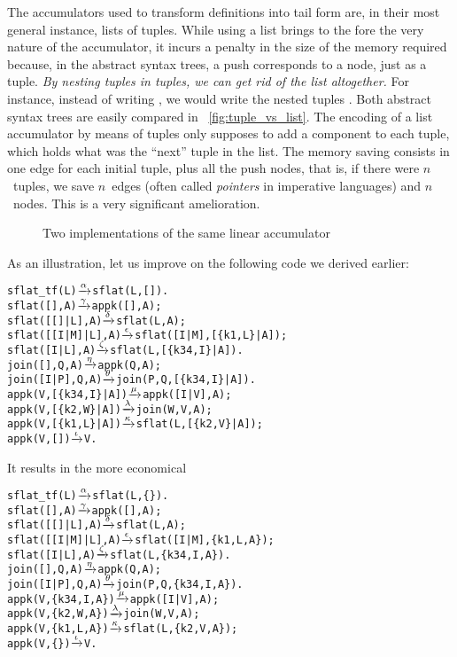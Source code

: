 The accumulators used to transform definitions into tail form are, in
their most general instance, lists of tuples. While using a list
brings to the fore the very nature of the accumulator, it incurs a
penalty in the size of the memory required because, in the abstract
syntax trees, a push corresponds to a node, just as a tuple. \emph{By
  nesting tuples in tuples, we can get rid of the list altogether.}
For instance, instead of writing
\erlcode{[\{k3,\(I_1\)\},\{k1,\(V\),\(E\)\},\{k3,\(I_2\)\}]}, we would
write the nested tuples
. Both
abstract syntax trees are easily compared in
\fig~\vref{fig:tuple_vs_list}. The encoding of a list accumulator by
means of tuples only supposes to add a component to each tuple, which
holds what was the ``next'' tuple in the list. The memory saving
consists in one edge for each initial tuple, plus all the push nodes,
that is, if there were \(n\)~tuples, we save \(n\)~edges (often called
\emph{pointers} in imperative languages) and \(n\)~nodes. This is a
very significant amelioration.
\begin{figure}[t]
\centering
{}
\caption{Two implementations of the same linear accumulator
\label{fig:tuple_vs_list}}
\end{figure}
As an illustration, let us improve on the following code we derived
earlier:
\begin{alltt}
sflat_tf(L)         \(\smashedrightarrow{\alpha}\) sflat(L,[]).
sflat(       [],A)  \(\smashedrightarrow{\gamma}\) appk([],A);
sflat(   [[]|L],A)  \(\smashedrightarrow{\delta}\) sflat(L,A);
sflat([[I|M]|L],A)  \(\smashedrightarrow{\epsilon}\) sflat([I|M],[\{k1,L\}|A]);
sflat(    [I|L],A)  \(\smashedrightarrow{\zeta}\) sflat(L,[\{k34,I\}|A]).
join(   [],Q,A)     \(\smashedrightarrow{\eta}\) appk(Q,A);
join([I|P],Q,A)     \(\smashedrightarrow{\theta}\) join(P,Q,[\{k34,I\}|A]).
appk(V,[\{k34,I\}|A]) \(\smashedrightarrow{\mu}\) appk([I|V],A);
appk(V,[\{k2,W\}|A])  \(\smashedrightarrow{\lambda}\) join(W,V,A);
appk(V,[\{k1,L\}|A])  \(\smashedrightarrow{\kappa}\) sflat(L,[\{k2,V\}|A]);
appk(V,        [])  \(\smashedrightarrow{\iota}\) V.
\end{alltt}
It results in the more economical
\begin{alltt}
sflat_tf(L)         \(\smashedrightarrow{\alpha}\) sflat(L,\{\}).
sflat(       [],A)  \(\smashedrightarrow{\gamma}\) appk([],A);
sflat(   [[]|L],A)  \(\smashedrightarrow{\delta}\) sflat(L,A);
sflat([[I|M]|L],A)  \(\smashedrightarrow{\epsilon}\) sflat([I|M],\{k1,L,A\});
sflat(    [I|L],A)  \(\smashedrightarrow{\zeta}\) sflat(L,\{k34,I,A\}).
join(   [],Q,A)     \(\smashedrightarrow{\eta}\) appk(Q,A);
join([I|P],Q,A)     \(\smashedrightarrow{\theta}\) join(P,Q,\{k34,I,A\}).
appk(V,\{k34,I,A\})   \(\smashedrightarrow{\mu}\) appk([I|V],A);
appk(V,\{k2,W,A\})    \(\smashedrightarrow{\lambda}\) join(W,V,A);
appk(V,\{k1,L,A\})    \(\smashedrightarrow{\kappa}\) sflat(L,\{k2,V,A\});
appk(V,      \{\})    \(\smashedrightarrow{\iota}\) V.
\end{alltt}

